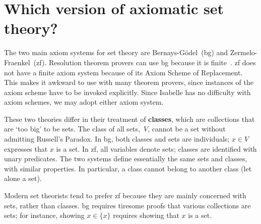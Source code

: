 \section{Which version of axiomatic set theory?}
The two main axiom systems for set theory are Bernays-G\"odel~({\sc bg})
and Zermelo-Fraenkel~({\sc zf}).  Resolution theorem provers can use {\sc
  bg} because it is finite~\cite{boyer86,quaife92}.  {\sc zf} does not
have a finite axiom system because of its Axiom Scheme of Replacement.
This makes it awkward to use with many theorem provers, since instances
of the axiom scheme have to be invoked explicitly.  Since Isabelle has no
difficulty with axiom schemes, we may adopt either axiom system.

These two theories differ in their treatment of {\bf classes}, which are
collections that are `too big' to be sets.  The class of all sets,~$V$,
cannot be a set without admitting Russell's Paradox.  In {\sc bg}, both
classes and sets are individuals; $x\in V$ expresses that $x$ is a set.  In
{\sc zf}, all variables denote sets; classes are identified with unary
predicates.  The two systems define essentially the same sets and classes,
with similar properties.  In particular, a class cannot belong to another
class (let alone a set).

Modern set theorists tend to prefer {\sc zf} because they are mainly concerned
with sets, rather than classes.  {\sc bg} requires tiresome proofs that various
collections are sets; for instance, showing $x\in\{x\}$ requires showing that
$x$ is a set.


